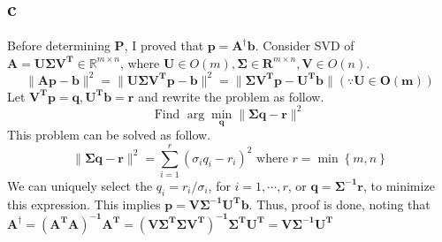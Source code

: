 \documentclass[10pt]{article}
\begin{document}
\subsection*{c}
Before determining $\mathbf{P}$, I proved that $\mathbf{p} = \mathbf{A}^\dagger \mathbf{b}$.
Consider SVD of $\mathbf{A = U\Sigma V^T} \in \mathbb{R}^{m\times n}$, where $\mathbf{U}\in O(m), \mathbf{\Sigma} \in \mathbf{R}^{m\times n}, \mathbf{V} \in O(n)$.
\begin{equation}
    \lVert \mathbf{Ap-b} \rVert^2 = \lVert \mathbf{U\Sigma V^Tp-b} \rVert^2 = \lVert \mathbf{\Sigma V^Tp - U^Tb} \rVert (\because \mathbf{U \in O(m)})
\end{equation}
Let $\mathbf{V^Tp = q}, \mathbf{U^Tb = r}$ and rewrite the problem as follow.
\begin{equation}
    \text{Find } \arg\min_{\mathbf{q}} \lVert \mathbf{\Sigma q} - \mathbf{r}\rVert^2
\end{equation}
This problem can be solved as follow.
\begin{equation}
    \lVert \mathbf{\Sigma q - r}\rVert^2 = \sum_{i=1}^r (\sigma_iq_i - r_i)^2 \text{ where } r = \min \left\{m,n\right\}
\end{equation}
We can uniquely select the $q_i = r_i/\sigma_i$, for $i = 1,\cdots, r$, or $\mathbf{q = \Sigma^{-1}\mathbf{r}}$, to minimize this expression.
This implies $\mathbf{p = V\Sigma^{-1}U^Tb}$. Thus, proof is done, noting that $\mathbf{A^\dagger = (A^TA)^{-1}A^T = (V\Sigma^T\Sigma V^T)^{-1}\Sigma^TU^T = V\Sigma^{-1}U^T}$

% 
\end{document}
